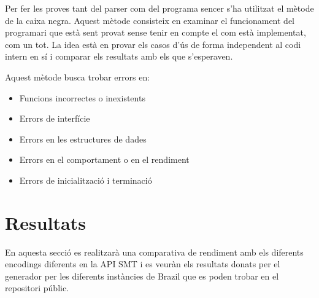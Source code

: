 \documentclass[11pt,a4paper,twoside]{report}
\begin{document}
   Per fer les proves tant del parser com del programa sencer s'ha utilitzat el mètode de la caixa negra\cite{wiki:blackbox}. Aquest mètode consisteix en examinar el funcionament del programari que està sent provat sense tenir en compte el com està implementat, com un tot. 
   La idea està en provar els casos d'ús de forma independent al codi intern en sí i comparar els resultats amb els que s'esperaven.
   
   Aquest mètode busca trobar errors en:
    \begin{itemize}
      \item Funcions incorrectes o inexistents
      \item Errors de interfície
      \item Errors en les estructures de dades
      \item Errors en el comportament o en el rendiment
      \item Errors de inicialització i terminació
    \end{itemize}


  
    
  \chapter{Resultats}
   
   

  En aquesta secció es realitzarà una comparativa de rendiment amb els diferents encodings diferents en la API SMT i es veuràn els resultats donats per el generador per les diferents instàncies de Brazil que es poden trobar en el repositori públic.
\end{document}
